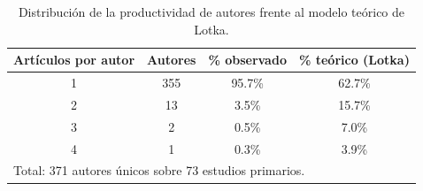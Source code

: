 \begin{table}[H]
\centering
\caption{Distribución de la productividad de autores frente al modelo teórico de Lotka.}
\label{tab:lotka}
\small
\renewcommand{\arraystretch}{1.3}
\begin{tabular}{|c|c|c|c|}
\hline
\textbf{Artículos por autor} & \textbf{Autores} & \textbf{\% observado} & \textbf{\% teórico (Lotka)} \\
\hline
1 & 355 & 95.7\% & 62.7\% \\
\hline
2 & 13 & 3.5\% & 15.7\% \\
\hline
3 & 2 & 0.5\% & 7.0\% \\
\hline
4 & 1 & 0.3\% & 3.9\% \\
\hline
\multicolumn{4}{|l|}{\footnotesize Total: 371 autores únicos sobre 73 estudios primarios.} \\
\hline
\end{tabular}
\end{table}